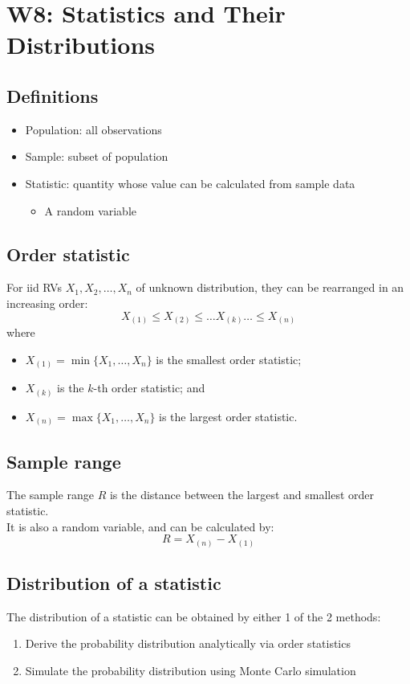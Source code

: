 \documentclass[a4paper]{article}
\begin{document}
\section{W8: Statistics and Their Distributions}
\subsection{Definitions}
\begin{itemize}
    \item Population: all observations
    \item Sample: subset of population
    \item Statistic: quantity whose value can be calculated from sample data
    \begin{itemize}[label=$\circ$]
        \item A random variable
    \end{itemize}
\end{itemize}
\subsection{Order statistic}
For iid RVs $X_{1}, X_{2}, \ldots , X_{n}$ of unknown distribution, they can be rearranged in an increasing order:
$$X_{(1)}\leq X_{(2)}\leq \ldots X_{(k)} \ldots \leq X_{(n)}$$
where
\begin{itemize}
    \item $X_{(1)} = \min\{X_{1}, \ldots , X_{n}\}$ is the smallest order statistic;
    \item $X_{(k)}$ is the $k$-th order statistic; and
    \item $X_{(n)} = \max\{X_{1}, \ldots , X_{n}\}$ is the largest order statistic.
\end{itemize}
\subsection{Sample range}
The sample range $R$ is the distance between the largest and smallest order statistic.\\
It is also a random variable, and can be calculated by:
$$R = X_{(n)} - X_{(1)}$$
\subsection{Distribution of a statistic}
The distribution of a statistic can be obtained by either 1 of the 2 methods:
\begin{enumerate}
    \item Derive the probability distribution analytically via order statistics
    \item Simulate the probability distribution using Monte Carlo simulation
\end{enumerate}
\end{document}
